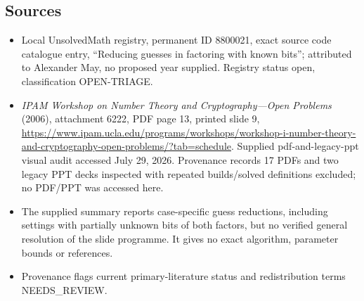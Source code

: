 \documentclass[11pt]{article}
\begin{document}
\subsection{Sources}
\begin{itemize}
\item Local UnsolvedMath registry, permanent ID 8800021, exact source code catalogue entry, ``Reducing guesses in factoring with known bits''; attributed to Alexander May, no proposed year supplied. Registry status open, classification OPEN-TRIAGE.
\item \emph{IPAM Workshop on Number Theory and Cryptography---Open Problems} (2006), attachment 6222, PDF page 13, printed slide 9, \url{https://www.ipam.ucla.edu/programs/workshops/workshop-i-number-theory-and-cryptography-open-problems/?tab=schedule}. Supplied pdf-and-legacy-ppt visual audit accessed July 29, 2026. Provenance records 17 PDFs and two legacy PPT decks inspected with repeated builds/solved definitions excluded; no PDF/PPT was accessed here.
\item The supplied summary reports case-specific guess reductions, including settings with partially unknown bits of both factors, but no verified general resolution of the slide programme. It gives no exact algorithm, parameter bounds or references.
\item Provenance flags current primary-literature status and redistribution terms NEEDS\_REVIEW.
\end{itemize}
\end{document}
